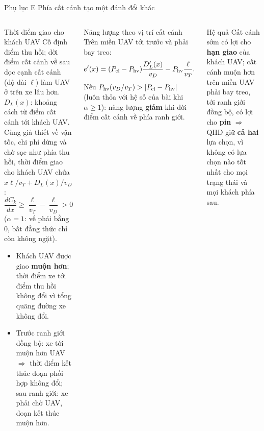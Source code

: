 \documentclass[aspectratio=169,10pt,t,xcolor={table}]{beamer}
\newcommand{\apptitle}[2]{Phụ lục #1 \textperiodcentered{} #2}
\begin{document}
\begin{frame}{\apptitle{E}{Phía cất cánh tạo một đánh đổi khác}}
\begin{columns}[T,onlytextwidth]
\begin{block}{Thời điểm giao cho khách UAV}
\scriptsize Cố định điểm thu hồi; dời điểm cất cánh về sau dọc cạnh cất cánh (độ dài $\ell$) làm UAV ở trên xe lâu hơn. $D_L(x)$: khoảng cách từ điểm cất cánh tới khách UAV. Cùng giả thiết về vận tốc, chi phí dừng và chờ sạc như phía thu hồi, thời điểm giao cho khách UAV chứa $x\ell/v_T+D_L(x)/v_D$:
\[
\frac{dC_k}{dx}\ge\frac{\ell}{v_T}-\frac{\ell}{v_D}>0
\]
($\alpha=1$: vế phải bằng 0, bất đẳng thức chỉ còn không ngặt).
\begin{itemize}
\item Khách UAV được giao \textbf{muộn hơn}; thời điểm xe tới điểm thu hồi không đổi vì tổng quãng đường xe không đổi.
\item Trước ranh giới đồng bộ: xe tới muộn hơn UAV $\Rightarrow$ thời điểm kết thúc đoạn phối hợp không đổi; sau ranh giới: xe phải chờ UAV, đoạn kết thúc muộn hơn.
\end{itemize}
\end{block}
\begin{block}{Năng lượng theo vị trí cất cánh}
\scriptsize Trên miền UAV tới trước và phải bay treo:
\[
e'(x)=(P_{\rm cl}-P_{\rm hv})\frac{D_L'(x)}{v_D}-P_{\rm hv}\frac{\ell}{v_T}.
\]
Nếu $P_{\rm hv}(v_D/v_T)>|P_{\rm cl}-P_{\rm hv}|$ (luôn thỏa với hệ số của bài khi $\alpha\ge1$): năng lượng \textbf{giảm} khi dời điểm cất cánh về phía ranh giới.
\end{block}
\begin{alertblock}{Hệ quả}
\scriptsize Cất cánh sớm có lợi cho \textbf{hạn giao} của khách UAV; cất cánh muộn hơn trên miền UAV phải bay treo, tới ranh giới đồng bộ, có lợi cho \textbf{pin} $\Rightarrow$ QHĐ giữ \textbf{cả hai} lựa chọn, vì không có lựa chọn nào tốt nhất cho mọi trạng thái và mọi khách phía sau.
\end{alertblock}
\end{columns}
\end{frame}
\end{document}
